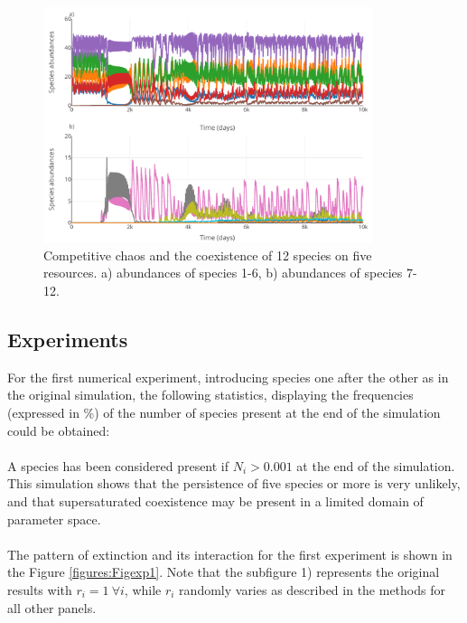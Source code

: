 \begin{figure}[H]
\begin{center} 
 \includegraphics[width=0.86\textwidth]{../Code/Figures/Figure_4.pdf}
  \caption{Competitive chaos and the coexistence of 12 species on five resources. a) abundances of species 1-6, b) abundances of species 7-12.}
  \label{figures:Fig4}
\end{center}
  \end{figure}

\subsection{Experiments}

For the first numerical experiment, introducing species one after the other as in the 
original simulation, the following statistics, displaying the frequencies 
(expressed in \%) of the number of species present at the end of the simulation 
could be obtained: \\


\\
A species has been considered present if $N_i > 0.001$ at the end of the simulation. This simulation shows that the persistence of five species or more is very unlikely, and that supersaturated coexistence may be present in a limited domain of parameter space.\\

\\
The pattern of extinction and its interaction for the first experiment is shown in the Figure \ref{figures:Figexp1}. Note that the subfigure 1) represents the original results with $r_i=1 ~\forall i$, while $r_i$ randomly varies as described in the methods for all other panels.


